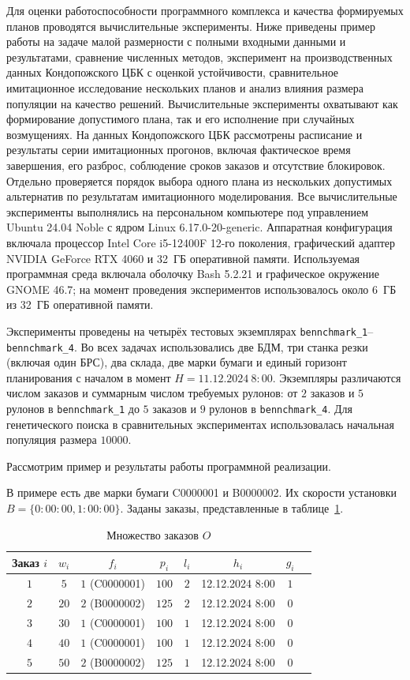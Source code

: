  Для оценки работоспособности программного комплекса и качества формируемых планов проводятся вычислительные эксперименты.
Ниже приведены пример работы на задаче малой размерности с полными входными данными и результатами, сравнение численных методов, эксперимент на производственных данных Кондопожского ЦБК с оценкой устойчивости, сравнительное имитационное исследование нескольких планов и анализ влияния размера популяции на качество решений.
Вычислительные эксперименты охватывают как формирование допустимого плана, так и его исполнение при случайных возмущениях. На данных Кондопожского ЦБК рассмотрены расписание и результаты серии имитационных прогонов, включая фактическое время завершения, его разброс, соблюдение сроков заказов и отсутствие блокировок. Отдельно проверяется порядок выбора одного плана из нескольких допустимых альтернатив по результатам имитационного моделирования.
Все вычислительные эксперименты выполнялись на персональном компьютере под управлением Ubuntu 24.04 Noble с ядром Linux 6.17.0-20-generic.
Аппаратная конфигурация включала процессор Intel Core i5-12400F 12-го поколения, графический адаптер NVIDIA GeForce RTX 4060 и 32~ГБ оперативной памяти.
Используемая программная среда включала оболочку Bash 5.2.21 и графическое окружение GNOME 46.7; на момент проведения экспериментов использовалось около 6~ГБ из 32~ГБ оперативной памяти.
 
 Эксперименты проведены на четырёх тестовых экземплярах \texttt{bennchmark\_1}--\texttt{bennchmark\_4}.
 Во всех задачах использовались две БДМ, три станка резки (включая один БРС), два склада, две марки бумаги и единый горизонт планирования с началом в момент $H=11.12.2024\ 8{:}00$.
 Экземпляры различаются числом заказов и суммарным числом требуемых рулонов: от $2$ заказов и $5$ рулонов в \texttt{bennchmark\_1} до $5$ заказов и $9$ рулонов в \texttt{bennchmark\_4}.
Для генетического поиска в сравнительных экспериментах использовалась начальная популяция размера $10000$.

Рассмотрим пример и результаты работы программной реализации.

В примере есть две марки бумаги C0000001 и B0000002.
Их скорости установки $B=\{0:00:00, 1:00:00\}$.
Заданы заказы, представленные в таблице~\ref{tab:orders}.

\begin{table}[h]
\centering
\caption{Множество заказов $O$}
\label{tab:orders}
\begin{tabular}{|c|c|c|c|c|c|c|c|}
\hline
Заказ $i$ & $w_{i}$ & $f_{i}$ & $p_{i}$ & $l_{i}$ & $h_{i}$ & $g_{i}$ \\
\hline
${1}$ & $5$  & $1$ (C0000001) & $100$ & $2$ & 12.12.2024 8:00 & $1$ \\
${2}$ & $20$ & $2$ (B0000002) & $125$ & $2$ & 12.12.2024 8:00 & $0$ \\
${3}$ & $30$ & $1$ (C0000001) & $100$ & $1$ & 12.12.2024 8:00 & $0$ \\
${4}$ & $40$ & $1$ (C0000001) & $100$ & $1$ & 12.12.2024 8:00 & $0$ \\
${5}$ & $50$ & $2$ (B0000002) & $125$ & $1$ & 12.12.2024 8:00 & $0$ \\
\hline
\end{tabular}
\end{table}

